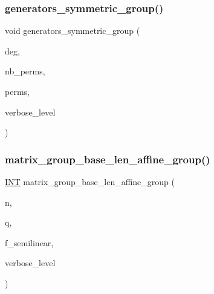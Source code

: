 \mbox{\label{group__generators_8_c_a4ecf08598133e7c90158d33894f91460}} 
\subsubsection{\texorpdfstring{generators\+\_\+symmetric\+\_\+group()}{generators\_symmetric\_group()}}
{\footnotesize\ttfamily void generators\+\_\+symmetric\+\_\+group (\begin{DoxyParamCaption}\item[{\mbox{\hyperlink{galois_8h_a09fddde158a3a20bd2dcadb609de11dc}{I\+NT}}}]{deg,  }\item[{\mbox{\hyperlink{galois_8h_a09fddde158a3a20bd2dcadb609de11dc}{I\+NT}} \&}]{nb\+\_\+perms,  }\item[{\mbox{\hyperlink{galois_8h_a09fddde158a3a20bd2dcadb609de11dc}{I\+NT}} $\ast$\&}]{perms,  }\item[{\mbox{\hyperlink{galois_8h_a09fddde158a3a20bd2dcadb609de11dc}{I\+NT}}}]{verbose\+\_\+level }\end{DoxyParamCaption})}

\mbox{\label{group__generators_8_c_a42ed38dd30e75ca9c315d973bee50305}} 
\subsubsection{\texorpdfstring{matrix\+\_\+group\+\_\+base\+\_\+len\+\_\+affine\+\_\+group()}{matrix\_group\_base\_len\_affine\_group()}}
{\footnotesize\ttfamily \mbox{\hyperlink{galois_8h_a09fddde158a3a20bd2dcadb609de11dc}{I\+NT}} matrix\+\_\+group\+\_\+base\+\_\+len\+\_\+affine\+\_\+group (\begin{DoxyParamCaption}\item[{\mbox{\hyperlink{galois_8h_a09fddde158a3a20bd2dcadb609de11dc}{I\+NT}}}]{n,  }\item[{\mbox{\hyperlink{galois_8h_a09fddde158a3a20bd2dcadb609de11dc}{I\+NT}}}]{q,  }\item[{\mbox{\hyperlink{galois_8h_a09fddde158a3a20bd2dcadb609de11dc}{I\+NT}}}]{f\+\_\+semilinear,  }\item[{\mbox{\hyperlink{galois_8h_a09fddde158a3a20bd2dcadb609de11dc}{I\+NT}}}]{verbose\+\_\+level }\end{DoxyParamCaption})}

